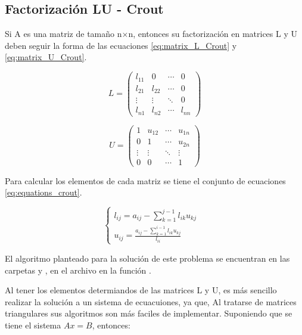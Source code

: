 \subsection{Factorización LU - Crout}

Si A es una matriz de tamaño n$\times$n, entonces su factorización en matrices L y U deben seguir la forma de las ecuaciones \ref{eq:matrix_L_Crout} y \ref{eq:matrix_U_Crout}.

\begin{equation}
    L = \begin{pmatrix}
        l_{11} & 0      & \cdots & 0      \\
        l_{21} & l_{22} & \cdots & 0      \\
        \vdots & \vdots & \ddots & 0      \\
        l_{n1} & l_{n2} & \cdots & l_{nn}
    \end{pmatrix}
    \label{eq:matrix_L_Crout}
\end{equation}

\begin{equation}
    U = \begin{pmatrix}
        1      & u_{12} & \cdots & u_{1n} \\
        0      & 1      & \cdots & u_{2n} \\
        \vdots & \vdots & \ddots & \vdots \\
        0      & 0      & \cdots & 1
    \end{pmatrix}
    \label{eq:matrix_U_Crout}
\end{equation}

Para calcular los elementos de cada matriz se tiene el conjunto de ecuaciones \ref{eq:equations_crout}.

\begin{equation}
    \begin{cases}
        l_{ij} = a_{ij} - \sum\limits_{k=1}^{j-1} l_{ik}u_{kj} & \\
        u_{ij} = \frac{a_{ij}-\sum\limits_{k=1}^{i-1}l_{ik}u_{kj}}{l_{ii}}
    \end{cases}
    \label{eq:equations_crout}
\end{equation}

El algoritmo planteado para la solución de este problema se encuentran en las carpetas  y , en el archivo  en la función .

Al tener los elementos determiandos de las matrices L y U, es más sencillo realizar la solución a un sistema de ecuacuiones, ya que, Al tratarse de matrices triangulares sus algoritmos son más faciles de implementar. Suponiendo que se tiene el sistema $Ax=B$, entonces:

